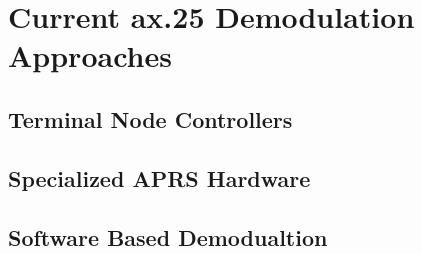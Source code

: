 \chapter{Current ax.25 Demodulation Approaches}

\section{Terminal Node Controllers}

\section{Specialized APRS Hardware}

\section{Software Based Demodualtion}
